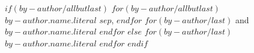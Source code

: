 $if(by-author/allbutlast)$%
$for(by-author/allbutlast)$%
{\large{$by-author.name.literal$}}%
$sep$, %
$endfor$%
$for(by-author/last)$%
{ and \large{$by-author.name.literal$}}%
$endfor$%
$else$%
$for(by-author/last)$%
{\large{$by-author.name.literal$}}%
$endfor$%
$endif$
